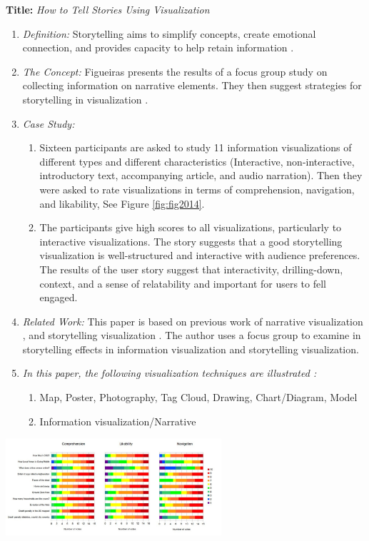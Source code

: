 \documentclass{egpubl}
\begin{document}
\textbf{Title:} \textit{How to Tell Stories Using Visualization}
\begin{enumerate}
\item \textit{Definition:} Storytelling aims to simplify concepts, create emotional connection, and provides capacity to help retain information \cite{figueiras2014tell}.
\item \textit{The Concept:} Figueiras presents the results of a focus group study on collecting information on narrative elements. They then suggest strategies for storytelling in visualization \cite{figueiras2014tell}.
\item  \textit{Case Study:} 
\begin{enumerate}
\item Sixteen participants are asked to study 11 information visualizations of different types and different characteristics (Interactive, non-interactive, introductory text, accompanying article, and audio narration). Then they were asked to rate visualizations in terms of  comprehension, navigation, and likability, See Figure \ref{fig:fig2014}. 
\item The participants give high scores to all visualizations, particularly to interactive visualizations. The story suggests that a good storytelling visualization is well-structured and interactive with audience preferences. The results of the user story suggest that interactivity, drilling-down, context, and a sense of relatability and important for users to fell engaged.
\end{enumerate}
\item \textit{Related Work:} This paper is based on previous work of narrative visualization \cite{segal}, and storytelling visualization \cite{Kosara,sci}. The author uses a focus group to examine in storytelling effects in information visualization and storytelling visualization.
\item \textit{In this paper, the following visualization techniques are illustrated :} 
\begin{enumerate}
\item Map, Poster, Photography, Tag Cloud, Drawing, Chart/Diagram, Model
\item Information visualization/Narrative
\end{enumerate}
\end{enumerate}

\begingroup
\centering
\includegraphics[width=8cm]{./images/fig2014}
\label{fig:fig2014}
\endgroup
\end{document}
